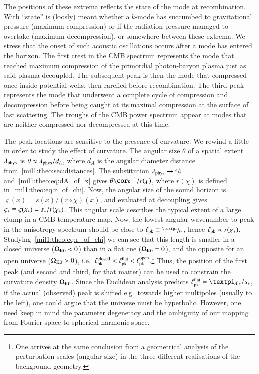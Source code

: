     The positions of these extrema reflects the state of the mode at recombination. With ``state'' is (loosly) meant whether a $k$-mode has succumbed to gravitational pressure (maximum compression) or if the radiation pressure managed to overtake (maximum decompression), or somewhere between these extrema. We stress that the onset of such acoustic oscillations occurs after a mode has entered the horizon. The first crest in the CMB spectrum represents the mode that reached maximum compression of the primordial photon-baryon plasma just as said plasma decoupled. The subsequent peak is then the mode that compressed once inside potential wells, then rarefied before recombination. The third peak represents the mode that underwent a complete cycle of compression and decompression before being caught at its maximal compression at the surface of last scattering. The troughs of the CMB power spectrum appear at modes that are neither compressed nor decompressed at this time. 

    The peak locations are sensitive to the presence of curvature. We rewind a little in order to study the effect of curvature. The angular size $\theta$ of a spatial extent $\lambda_\mathrm{phys}$ is $\theta\approx\lambda_\mathrm{phys}/d_A$, where $d_A$ is the angular diameter distance from~\cref{mil1:theo:sec:distances}. The substitution $\lambda_\mathrm{phys} \to \sfrac{a}{k}$ and~\cref{mil1:theo:eq:dA_of_x} gives $\theta \cor  k^{-1}/r(\chi) $, where $r(\chi)$ is defined in~\cref{mil1:theo:eq:r_of_chi}. Now, the angular size of the sound horizon is $\varsigma(x) = s(x)/(r\circ\chi )(x)$, and evaluated at decoupling gives $\varsigma_*\equiv \varsigma(x_*)=s_*/r(\chi_*)$. This angular scale describes the typical extent of a large clump in a CMB temperature map. Now, the lowest angular wavenumber to peak in the anisotropy spectrum should be close to $\ell\ped{pk}\equiv \sfrac{\pi}{\varsigma_*}$, hence $\ell_\mathrm{pk}\propto r(\chi_*) $. Studying~\cref{mil1:theo:eq:r_of_chi} we can see that this length is smaller in a closed universe ($\Omega_{\mathrm{K}0} < 0$) than in a flat one ($\Omega_{\mathrm{K}0} = 0$), and the opposite for an open universe ($\Omega_{\mathrm{K}0} > 0$), i.e.~$\ell_\mathrm{pk}^\mathrm{closed}< \ell_\mathrm{pk}^\mathrm{flat}<\ell_\mathrm{pk}^\mathrm{open}$.\footnote{One arrives at the same conclusion from a geometrical analysis of the perturbation scales (angular size) in the three different realisations of the background geometry.} Thus, the position of the first peak (and second and third, for that matter) can be used to constrain the curvature density $\Omega_{\mathrm{K}0}$. Since the Euclidean analysis predicts $\ell\ped{pk}\ap{flat} = \pi \chi_*/s_*$, if the actual (observed) peak is shifted e.g.~towards higher multipoles (usually to the left), one could argue that the universe must be hyperbolic. However, one need keep in mind the parameter degeneracy and the ambiguity of our mapping from Fourier space to spherical harmonic space.
    

